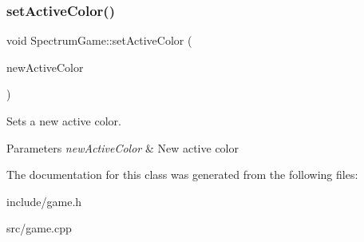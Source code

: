 \subsubsection{\texorpdfstring{set\+Active\+Color()}{setActiveColor()}}
{\footnotesize\ttfamily void Spectrum\+Game\+::set\+Active\+Color (\begin{DoxyParamCaption}\item[{Q\+Color}]{new\+Active\+Color }\end{DoxyParamCaption})}



Sets a new active color. 


\begin{DoxyParams}{Parameters}
{\em new\+Active\+Color} & New active color \\
\hline
\end{DoxyParams}


The documentation for this class was generated from the following files\+:\begin{DoxyCompactItemize}
\item 
include/game.\+h\item 
src/game.\+cpp\end{DoxyCompactItemize}
